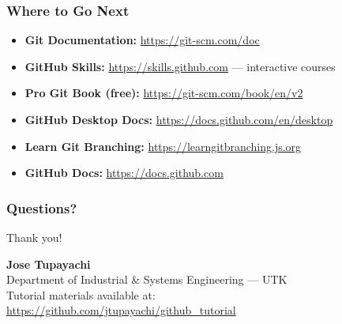 \documentclass{beamer}
\begin{document}
\begin{frame}
\frametitle{Where to Go Next}

\begin{itemize}
    \item \textbf{Git Documentation:} \url{https://git-scm.com/doc}
    \item \textbf{GitHub Skills:} \url{https://skills.github.com} --- interactive courses
    \item \textbf{Pro Git Book (free):} \url{https://git-scm.com/book/en/v2}
    \item \textbf{GitHub Desktop Docs:} \url{https://docs.github.com/en/desktop}
    \item \textbf{Learn Git Branching:} \url{https://learngitbranching.js.org}
    \item \textbf{GitHub Docs:} \url{https://docs.github.com}
\end{itemize}
\end{frame}

\begin{frame}
\frametitle{Questions?}
\centering
\vspace{10mm}
{\Large Thank you!}

\vspace{8mm}
\textbf{Jose Tupayachi}\\
Department of Industrial \& Systems Engineering --- UTK\\[4mm]
\vspace{4mm}
\small Tutorial materials available at:\\
\url{https://github.com/jtupayachi/github\_tutorial}
\end{frame}
\end{document}
